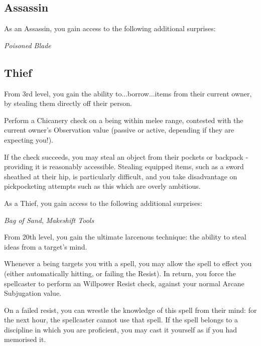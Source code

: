 \subsection*{\bf Assassin}


As an Assassin, you gain access to the following additional surprises:

{\it Poisoned Blade}

\subsection*{\bf Thief}



From 3rd level, you gain the ability to...borrow...items from their current owner, by stealing them directly off their person. 

Perform a Chicanery check on a being within melee range, contested with the current owner's Observation value (passive or active, depending if they are expecting you!). 

If the check succeeds, you may steal an object from their pockets or backpack - providing it is reasonably accessible. Stealing equipped items, such as a sword sheathed at their hip, is particularly difficult, and you take disadvantage on pickpocketing attempts such as this which are overly ambitious.   



As a Thief, you gain access to the following additional surprises:

{\it Bag of Sand}, {\it Makeshift Tools}


From 20th level, you gain the ultimate larcenous technique: the ability to steal ideas from a target's mind.

Whenever a being targets you with a spell, you may allow the spell to effect you (either automatically hitting, or failing the Resist). In return, you force the spellcaster to perform an Willpower Resist check, against your normal Arcane Subjugation value. 

On a failed resist, you can wrestle the knowledge of this spell from their mind: for the next hour, the spellcaster cannot use that spell. If the spell belongs to a discipline in which you are proficient, you may cast it yourself as if you had memorised it.  


